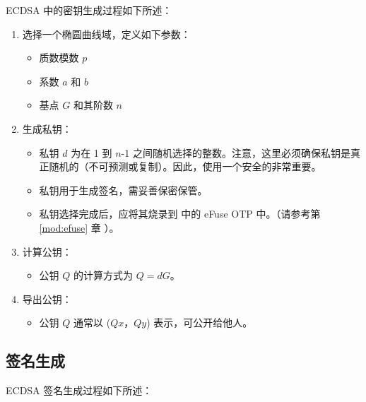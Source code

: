 \documentclass[main\_\_CN.tex]{subfiles}
\begin{document}
ECDSA 中的密钥生成过程如下所述：
\begin{enumerate}
    \item 选择一个椭圆曲线域，定义如下参数：
    \begin{itemize}
        \item 质数模数 $p$
        \item 系数 $a$ 和 $b$
        \item 基点 $G$ 和其阶数 $n$
    \end{itemize}
    \item 生成私钥：
    \begin{itemize}
        \item 私钥 $d$ 为在 1 到 $n$-1 之间随机选择的整数。注意，这里必须确保私钥是真正随机的（不可预测或复制）。因此，使用一个安全的\textit{}非常重要。
        \item 私钥用于生成签名，需妥善保密保管。
        \item 私钥选择完成后，应将其烧录到 \chipname{} 中的 eFuse OTP 中。（请参考第 \ref{mod:efuse} 章 \textit{}）。
    \end{itemize}
    \item 计算公钥：
    \begin{itemize}
        \item 公钥 $Q$ 的计算方式为 $Q = dG$。
    \end{itemize}
    \item 导出公钥：
    \begin{itemize}
        \item 公钥 $Q$ 通常以 ($Qx$，$Qy$) 表示，可公开给他人。
    \end{itemize}
\end{enumerate}
\subsection{签名生成}

ECDSA 签名生成过程如下所述：
\end{document}
